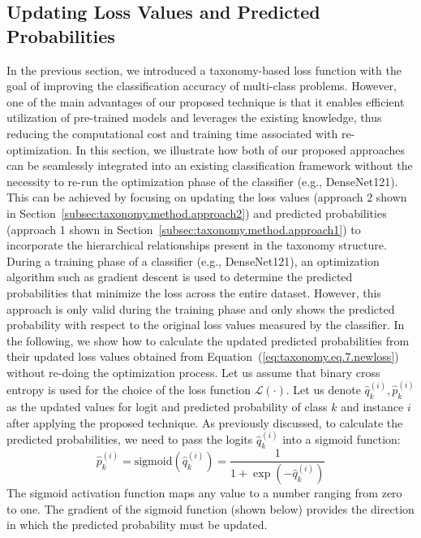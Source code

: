 \documentclass[authoryear,preprint,review,12pt]{elsarticle}
\begin{document}
\subsection{Updating Loss Values and Predicted Probabilities}\label{subsec:updating-loss-values-and-predicted-probabilities}
In the previous section, we introduced a taxonomy-based loss function with the goal of improving the classification accuracy of multi-class problems. However, one of the main advantages of our proposed technique is that it enables efficient utilization of pre-trained models and leverages the existing knowledge, thus reducing the computational cost and training time associated with re-optimization. In this section, we illustrate how both of our proposed approaches can be seamlessly integrated into an existing classification framework without the necessity to re-run the optimization phase of the classifier (e.g., DenseNet121). This can be achieved by focusing on updating the loss values (approach 2 shown in Section~\ref{subsec:taxonomy.method.approach2}) and predicted probabilities (approach 1 shown in Section~\ref{subsec:taxonomy.method.approach1}) to incorporate the hierarchical relationships present in the taxonomy structure.
During a training phase of a classifier (e.g., DenseNet121), an optimization algorithm such as gradient descent is used to determine the predicted probabilities that minimize the loss across the entire dataset. However, this approach is only valid during the training phase and only shows the predicted probability with respect to the original loss values measured by the classifier.
In the following, we show how to calculate the updated predicted probabilities from their updated loss values obtained from Equation~(\ref{eq:taxonomy.eq.7.newloss}) without re-doing the optimization process. Let us assume that binary cross entropy is used for the choice of the loss function $\mathcal{L}(\cdot) $. Let us denote $\widehat{q}_k^{(i)}, \widehat{p}_k^{(i)} $ as the updated values for logit and predicted probability of class $k $ and instance $i $ after applying the proposed technique. As previously discussed, to calculate the predicted probabilities, we need to pass the logits ${\widehat q}_k^{(i)} $ into a sigmoid function:
\begin{equation}
    \label{eq:taxonomy.eq.9.sigmoid}
    \widehat{p}_k^{(i)}=\text{sigmoid}\left(\widehat{q}_k^{(i)}\right)=\frac1{1+\exp\left(-\widehat{q}_k^{(i)}\right)}
\end{equation}
The sigmoid activation function maps any value to a number ranging from zero to one. The gradient of the sigmoid function (shown below) provides the direction in which the predicted probability must be updated.
\end{document}
